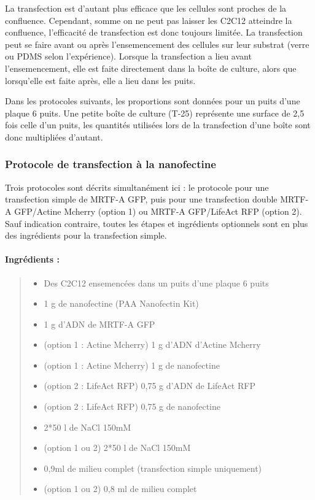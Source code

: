 	La transfection est d'autant plus efficace que les cellules sont proches de la confluence. Cependant, somme on ne peut pas laisser les C2C12 atteindre la confluence, l'efficacité de transfection est donc toujours limitée. La transfection peut se faire avant ou après l'ensemencement des cellules sur leur substrat (verre ou PDMS selon l'expérience). Lorsque la transfection a lieu avant l'ensemencement, elle est faite directement dans la boîte de culture, alors que lorsqu'elle est faite après, elle a lieu dans les puits. 
	
	 Dans les protocoles suivants, les proportions sont données pour un puits d'une plaque 6 puits. Une petite boîte de culture (T-25) représente une surface de 2,5 fois celle d'un puits, les quantités utilisées lors de la transfection d'une boîte sont donc multipliées d'autant.
	
	\subsubsection{Protocole de transfection à la nanofectine}
	
	Trois protocoles sont décrits simultanément ici : le protocole pour une transfection simple de MRTF-A GFP, puis pour une transfection double MRTF-A GFP/Actine Mcherry (option 1) ou MRTF-A GFP/LifeAct RFP (option 2). Sauf indication contraire, toutes les étapes et ingrédients optionnels sont en plus des ingrédients pour la transfection simple.
	
\paragraph{Ingrédients :}
\begin{quote}

	\begin{itemize}
	\item Des C2C12 ensemencées dans un puits d'une plaque 6 puits
	\item 1 \micro g de nanofectine (PAA Nanofectin Kit)
	\item 1 \micro g d'ADN de MRTF-A GFP
	\item (option 1 : Actine Mcherry) 1 \micro g d'ADN d'Actine Mcherry
	\item (option 1 : Actine Mcherry) 1 \micro g de nanofectine
	\item (option 2 : LifeAct RFP) 0,75 \micro g d'ADN de LifeAct RFP
	\item (option 2 : LifeAct RFP) 0,75 \micro g de nanofectine
	\item 2*50 \micro l de NaCl 150mM
	\item (option 1 ou 2) 2*50 \micro l de NaCl 150mM
	\item 0,9ml de milieu complet (transfection simple uniquement)
	\item (option 1 ou 2) 0,8 ml de milieu complet
	\end{itemize}
\end{quote}

